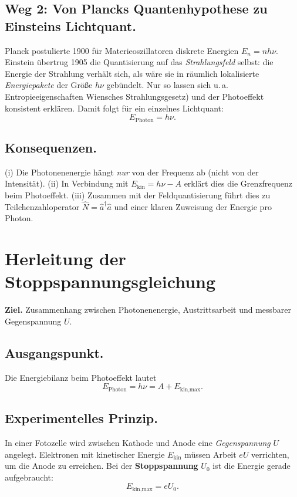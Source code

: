 \subsection*{Weg 2: Von Plancks Quantenhypothese zu Einsteins Lichtquant.}
Planck postulierte 1900 für Materieoszillatoren diskrete Energien \(E_n=n h\nu\).
Einstein übertrug 1905 die Quantisierung auf das \emph{Strahlungsfeld} selbst: die Energie der Strahlung verhält sich, als wäre sie in räumlich lokalisierte \emph{Energiepakete} der Größe \(h\nu\) gebündelt. 
Nur so lassen sich u.\,a. Entropieeigenschaften Wiensches Strahlungsgesetz) und der Photoeffekt konsistent erklären. 
Damit folgt für ein einzelnes Lichtquant:
\[
E_{\text{Photon}} = h\nu.
\]

\subsection*{Konsequenzen.}
(i) Die Photonenenergie hängt \emph{nur} von der Frequenz ab (nicht von der Intensität). 
(ii) In Verbindung mit \(E_{\text{kin}}=h\nu-A\) erklärt dies die Grenzfrequenz beim Photoeffekt. 
(iii) Zusammen mit der Feldquantisierung führt dies zu Teilchenzahloperator \(\hat N=\hat a^\dagger \hat a\) und einer klaren Zuweisung der Energie pro Photon.

\section{Herleitung der Stoppspannungsgleichung}
\label{anhangA:stoppspannung}

\textbf{Ziel.} Zusammenhang zwischen Photonenenergie, Austrittsarbeit und messbarer Gegenspannung \(U\).

\subsection*{Ausgangspunkt.}
Die Energiebilanz beim Photoeffekt lautet
\[
E_{\text{Photon}} = h\nu = A + E_{\text{kin,max}}.
\]

\subsection*{Experimentelles Prinzip.}
In einer Fotozelle wird zwischen Kathode und Anode eine \emph{Gegenspannung} \(U\) angelegt.  
Elektronen mit kinetischer Energie \(E_{\text{kin}}\) müssen Arbeit \(eU\) verrichten, um die Anode zu erreichen.  
Bei der \textbf{Stoppspannung} \(U_0\) ist die Energie gerade aufgebraucht:
\[
E_{\text{kin,max}} = eU_0.
\]

